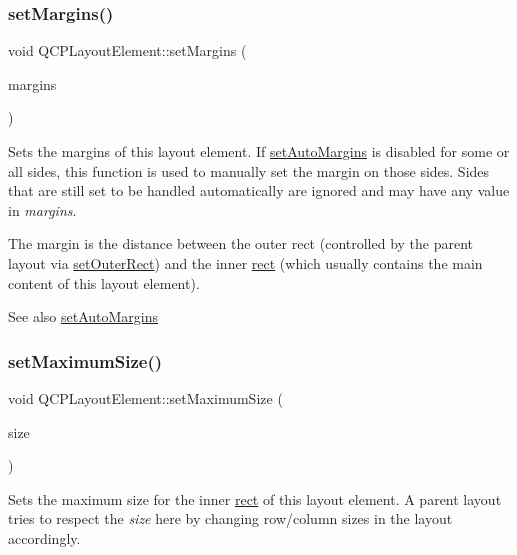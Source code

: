 \subsubsection{\texorpdfstring{set\+Margins()}{setMargins()}}
{\footnotesize\ttfamily void Q\+C\+P\+Layout\+Element\+::set\+Margins (\begin{DoxyParamCaption}\item[{const Q\+Margins \&}]{margins }\end{DoxyParamCaption})}

Sets the margins of this layout element. If \hyperlink{class_q_c_p_layout_element_accfda49994e3e6d51ed14504abf9d27d}{set\+Auto\+Margins} is disabled for some or all sides, this function is used to manually set the margin on those sides. Sides that are still set to be handled automatically are ignored and may have any value in {\itshape margins}.

The margin is the distance between the outer rect (controlled by the parent layout via \hyperlink{class_q_c_p_layout_element_a38975ea13e36de8e53391ce41d94bc0f}{set\+Outer\+Rect}) and the inner \hyperlink{class_q_c_p_layout_element_a208effccfe2cca4a0eaf9393e60f2dd4}{rect} (which usually contains the main content of this layout element).

\begin{DoxySeeAlso}{See also}
\hyperlink{class_q_c_p_layout_element_accfda49994e3e6d51ed14504abf9d27d}{set\+Auto\+Margins} 
\end{DoxySeeAlso}
\mbox{\label{class_q_c_p_layout_element_a74eb5280a737ab44833d506db65efd95}} 
\subsubsection{\texorpdfstring{set\+Maximum\+Size()}{setMaximumSize()}\hspace{0.1cm}{\footnotesize\ttfamily [1/2]}}
{\footnotesize\ttfamily void Q\+C\+P\+Layout\+Element\+::set\+Maximum\+Size (\begin{DoxyParamCaption}\item[{const Q\+Size \&}]{size }\end{DoxyParamCaption})}

Sets the maximum size for the inner \hyperlink{class_q_c_p_layout_element_a208effccfe2cca4a0eaf9393e60f2dd4}{rect} of this layout element. A parent layout tries to respect the {\itshape size} here by changing row/column sizes in the layout accordingly. \mbox{\label{class_q_c_p_layout_element_a03e0e9c48f230217c529b0819f832d84}} 
